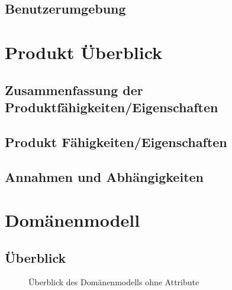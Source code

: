 \documentclass[a4paper,12pt,twoside]{scrreprt}
\begin{document}
    \section{Benutzerumgebung}
    

    \chapter{Produkt Überblick}
    
    \section{Zusammenfassung der Produktfähigkeiten/Eigenschaften}
    
    \section{Produkt Fähigkeiten/Eigenschaften}
    


    \section{Annahmen und Abhängigkeiten}

    \chapter{Domänenmodell}
    \section{Überblick}
    \begin{figure}[ht!]
        \begin{center}
            \caption{Überblick des Domänenmodells ohne Attribute}\label{domainmodel}
        \end{center}
    \end{figure}
    \newpage
\end{document}
